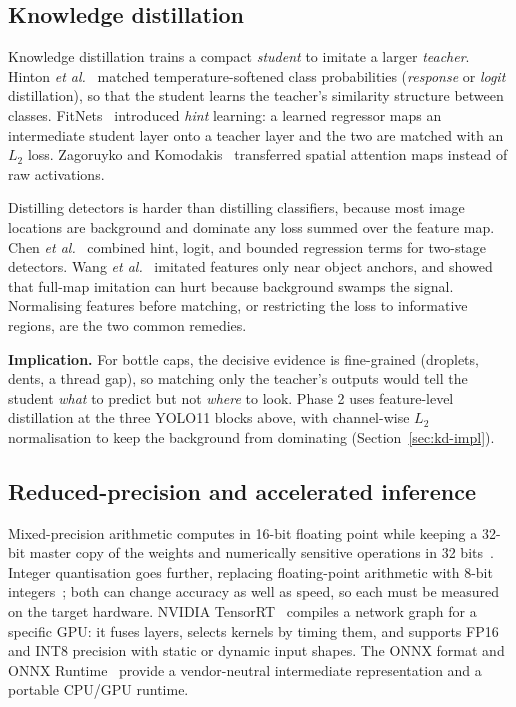 \subsection{Knowledge distillation}
\label{sec:lit-kd}

Knowledge distillation trains a compact \textit{student} to imitate a larger \textit{teacher}. Hinton \textit{et al.}~\cite{hinton2015} matched temperature-softened class probabilities (\textit{response} or \textit{logit} distillation), so that the student learns the teacher's similarity structure between classes. FitNets~\cite{romero2015} introduced \textit{hint} learning: a learned regressor maps an intermediate student layer onto a teacher layer and the two are matched with an $L_2$ loss. Zagoruyko and Komodakis~\cite{zagoruyko2017} transferred spatial attention maps instead of raw activations.

Distilling detectors is harder than distilling classifiers, because most image locations are background and dominate any loss summed over the feature map. Chen \textit{et al.}~\cite{chen2017kd} combined hint, logit, and bounded regression terms for two-stage detectors. Wang \textit{et al.}~\cite{wang2019fgfi} imitated features only near object anchors, and showed that full-map imitation can hurt because background swamps the signal. Normalising features before matching, or restricting the loss to informative regions, are the two common remedies.

\noindent\textbf{Implication.} For bottle caps, the decisive evidence is fine-grained (droplets, dents, a thread gap), so matching only the teacher's outputs would tell the student \emph{what} to predict but not \emph{where} to look. Phase 2 uses feature-level distillation at the three YOLO11 blocks above, with channel-wise $L_2$ normalisation to keep the background from dominating (Section~\ref{sec:kd-impl}).

\subsection{Reduced-precision and accelerated inference}
\label{sec:lit-trt}

Mixed-precision arithmetic computes in 16-bit floating point while keeping a 32-bit master copy of the weights and numerically sensitive operations in 32 bits~\cite{micikevicius2018}. Integer quantisation goes further, replacing floating-point arithmetic with 8-bit integers~\cite{jacob2018}; both can change accuracy as well as speed, so each must be measured on the target hardware. NVIDIA TensorRT~\cite{tensorrt} compiles a network graph for a specific GPU: it fuses layers, selects kernels by timing them, and supports FP16 and INT8 precision with static or dynamic input shapes. The ONNX format and ONNX Runtime~\cite{onnxruntime} provide a vendor-neutral intermediate representation and a portable CPU/GPU runtime.

